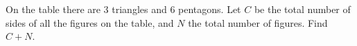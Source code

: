 On the table there are 3 triangles and 6 pentagons. Let $C$ be the total number of sides of all the figures on the table, and $N$ the total number of figures. Find $C+N$.
